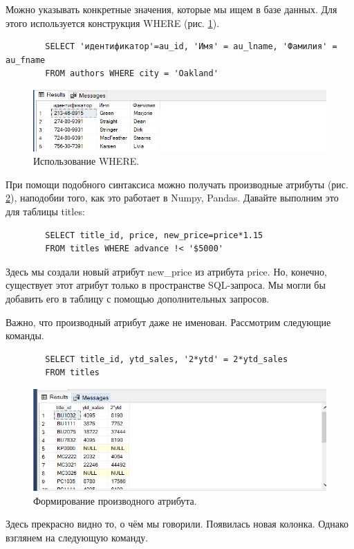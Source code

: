 Можно указывать конкретные значения, которые мы ищем в базе данных. Для этого используется конструкция WHERE (рис. \ref{fig:WHEREC}).

\begin{verbatim}
        SELECT 'идентификатор'=au_id, 'Имя' = au_lname, 'Фамилия' = au_fname
        FROM authors WHERE city = 'Oakland'
\end{verbatim}
\begin{figure}[h!]
    \centering
    \includegraphics[width=0.9\linewidth]{Pic/lab4/SQ4.PNG}
    \caption{Использование WHERE.}
    \label{fig:WHEREC}
\end{figure}

При помощи подобного синтаксиса можно получать производные атрибуты (рис. \ref{fig:Catrib}), наподобии того, как это работает в Numpy, Pandas. Давайте выполним это для таблицы titles:

\begin{verbatim}
        SELECT title_id, price, new_price=price*1.15
        FROM titles WHERE advance !< '$5000'
\end{verbatim}

Здесь мы создали новый атрибут new\_price из атрибута price. Но, конечно, существует этот атрибут только в пространстве SQL-запроса. Мы могли бы добавить его в таблицу с помощью дополнительных запросов.

Важно, что производный атрибут даже не именован. Рассмотрим следующие команды. 

\begin{verbatim}
        SELECT title_id, ytd_sales, '2*ytd' = 2*ytd_sales
        FROM titles
\end{verbatim}
\begin{figure}[h!]
    \centering
    \includegraphics[width=0.9\linewidth]{Pic/lab4/SQL5.PNG}
    \caption{Формирование производного атрибута.}
    \label{fig:Catrib}
\end{figure}
Здесь прекрасно видно то, о чём мы говорили. Появилась новая колонка. Однако взглянем на следующую команду.

